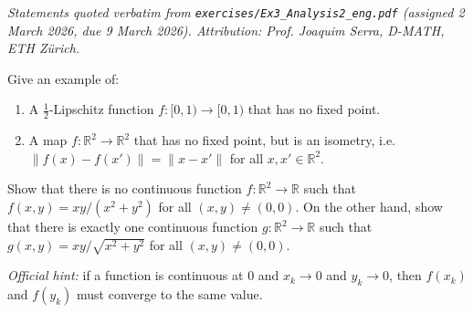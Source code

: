 
\textit{Statements quoted verbatim from \texttt{exercises/Ex3\_Analysis2\_eng.pdf} (assigned 2
March 2026, due 9 March 2026). Attribution: Prof. Joaquim Serra, D-MATH, ETH Z\"urich.}

\begin{exercise}
\label{ex:3.1}
Give an example of:
\begin{enumerate}[label=\textbf{(\alph*)}]
  \item A $\tfrac{1}{2}$-Lipschitz function $f : [0,1) \to [0,1)$ that has no fixed point.
  \item A map $f : \mathbb{R}^2 \to \mathbb{R}^2$ that has no fixed point, but is an isometry,
    i.e.\ $\|f(x) - f(x')\| = \|x - x'\|$ for all $x, x' \in \mathbb{R}^2$.
\end{enumerate}
\end{exercise}

\begin{exercise}
\label{ex:3.2}
Show that there is no continuous function $f : \mathbb{R}^2 \to \mathbb{R}$ such that
$f(x,y) = xy/(x^2+y^2)$ for all $(x,y) \neq (0,0)$. On the other hand, show that there is exactly
one continuous function $g : \mathbb{R}^2 \to \mathbb{R}$ such that
$g(x,y) = xy/\sqrt{x^2+y^2}$ for all $(x,y) \neq (0,0)$.

\textit{Official hint:} if a function is continuous at $0$ and $x_k \to 0$ and $y_k \to 0$, then
$f(x_k)$ and $f(y_k)$ must converge to the same value.
\end{exercise}


